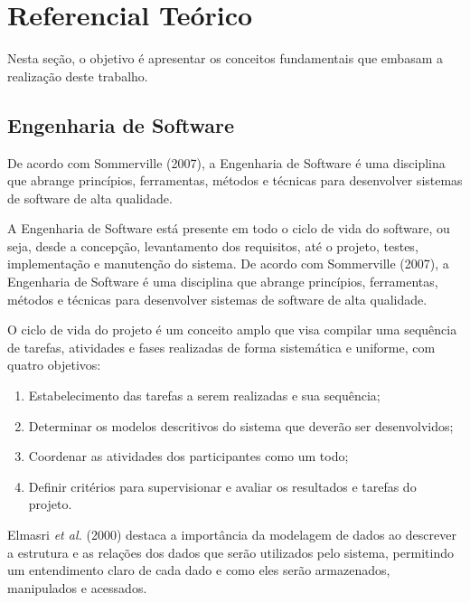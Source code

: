 % 

\chapter[Referencial Teórico]{Referencial Teórico}

Nesta seção, o objetivo é apresentar os conceitos fundamentais que embasam a realização deste trabalho.

\section{Engenharia de Software}
\nocite{sommerville2007sommerville}
De acordo com Sommerville (2007), a Engenharia de Software é uma disciplina que abrange princípios, ferramentas, métodos e técnicas para desenvolver sistemas de software de alta qualidade.

A Engenharia de Software está presente em todo o ciclo de vida do software, ou seja, desde a concepção, levantamento dos requisitos, até o projeto, testes, implementação e manutenção do sistema. De acordo com Sommerville (2007), a Engenharia de Software é uma disciplina que abrange princípios, ferramentas, métodos e técnicas para desenvolver sistemas de software de alta qualidade.

O ciclo de vida do projeto é um conceito amplo que visa compilar uma sequência de tarefas, atividades e fases realizadas de forma sistemática e uniforme, com quatro objetivos: 

\begin{enumerate}
    \item  Estabelecimento das tarefas a serem realizadas e sua sequência;
    \item Determinar os modelos descritivos do sistema que deverão ser desenvolvidos;
    \item Coordenar as atividades dos participantes como um todo;
    \item Definir critérios para supervisionar e avaliar os resultados e tarefas do projeto.
\end{enumerate}

\nocite{elmasri2000fundamentals}
Elmasri \textit{et al.} (2000) destaca a importância da modelagem de dados ao descrever a estrutura e as relações dos dados que serão utilizados pelo sistema, permitindo um entendimento claro de cada dado e como eles serão armazenados, manipulados e acessados.

